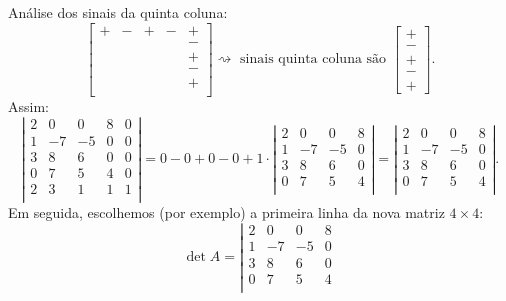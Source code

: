 \begin{ex}
Análise dos sinais da quinta coluna:
\begin{equation}
\begin{bmatrix}
+ & - & + & - & + \\
 &&&& - \\
 &&&& + \\
 &&&& - \\
 &&&& + \\
\end{bmatrix}\rightsquigarrow \text{ sinais quinta coluna são }
\begin{bmatrix}
+ \\ - \\ + \\ - \\ +
\end{bmatrix}.
\end{equation} Assim:
\begin{equation}
\left|
\begin{matrix}
2 & 0 & 0 & 8 & 0 \\
1 & -7 & -5 & 0 & 0 \\
3 & 8 & 6 & 0 & 0 \\
0 & 7 & 5 & 4 & 0 \\
2 & 3 & 1 & 1 & 1 \\
\end{matrix}
\right| = 0 - 0 + 0 - 0 + 1\cdot
\left|
\begin{matrix}
2 & 0 & 0 & 8  \\
1 & -7 & -5 & 0  \\
3 & 8 & 6 & 0  \\
0 & 7 & 5 & 4  \\
\end{matrix}
\right| =
\left|
\begin{matrix}
2 & 0 & 0 & 8  \\
1 & -7 & -5 & 0  \\
3 & 8 & 6 & 0  \\
0 & 7 & 5 & 4  \\
\end{matrix}
\right|.
\end{equation} Em seguida, escolhemos (por exemplo) a primeira linha da nova matriz $4 \times 4$:
\begin{equation}
\det A = \left|
\begin{matrix}
2 & 0 & 0 & 8  \\
1 & -7 & -5 & 0  \\
3 & 8 & 6 & 0  \\
0 & 7 & 5 & 4  \\

\end{matrix}
\end{equation}
\end{ex}

